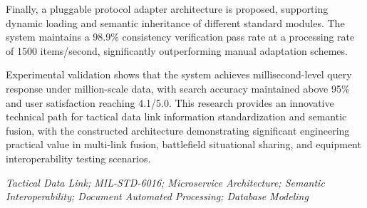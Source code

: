 Finally, a pluggable protocol adapter architecture is proposed, supporting dynamic loading and semantic inheritance of different standard modules. The system maintains a 98.9\% consistency verification pass rate at a processing rate of 1500 items/second, significantly outperforming manual adaptation schemes.

Experimental validation shows that the system achieves millisecond-level query response under million-scale data, with search accuracy maintained above 95\% and user satisfaction reaching 4.1/5.0. This research provides an innovative technical path for tactical data link information standardization and semantic fusion, with the constructed architecture demonstrating significant engineering practical value in multi-link fusion, battlefield situational sharing, and equipment interoperability testing scenarios.


\vspace{0.5cm}
\hspace{-1cm}
{\bf{}} \textit{Tactical Data Link; MIL-STD-6016; Microservice Architecture; Semantic Interoperability; Document Automated Processing; Database Modeling}


































